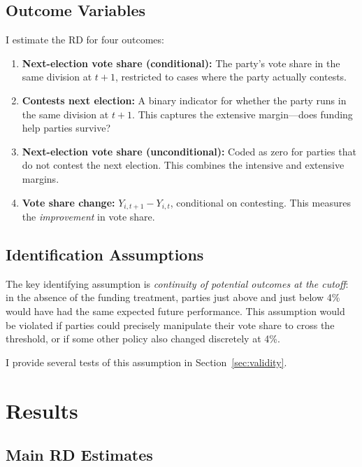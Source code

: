 \documentclass[12pt, a4paper]{article}
\begin{document}
\subsection{Outcome Variables}

I estimate the RD for four outcomes:

\begin{enumerate}
    \item \textbf{Next-election vote share (conditional):} The party's vote share in the same division at $t+1$, restricted to cases where the party actually contests.

    \item \textbf{Contests next election:} A binary indicator for whether the party runs in the same division at $t+1$. This captures the extensive margin---does funding help parties survive?

    \item \textbf{Next-election vote share (unconditional):} Coded as zero for parties that do not contest the next election. This combines the intensive and extensive margins.

    \item \textbf{Vote share change:} $Y_{i,t+1} - Y_{i,t}$, conditional on contesting. This measures the \emph{improvement} in vote share.
\end{enumerate}

\subsection{Identification Assumptions}

The key identifying assumption is \emph{continuity of potential outcomes at the cutoff}: in the absence of the funding treatment, parties just above and just below 4\% would have had the same expected future performance. This assumption would be violated if parties could precisely manipulate their vote share to cross the threshold, or if some other policy also changed discretely at 4\%.

I provide several tests of this assumption in Section~\ref{sec:validity}.

\section{Results}
\label{sec:results}

\subsection{Main RD Estimates}
\end{document}
